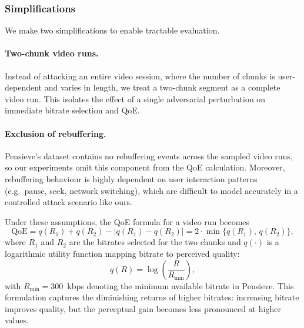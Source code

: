 \documentclass[thesis]{uofithesis} %
\begin{document}
    
    \subsubsection{Simplifications}
    \label{sec:attack-simplification}
    
    We make two simplifications to enable tractable evaluation.
    
    \paragraph{Two-chunk video runs.}
    Instead of attacking an entire video session, where the number of
    chunks is user-dependent and varies in length, we treat a two-chunk
    segment as a complete video run.  This isolates the effect of a single
    adversarial perturbation on immediate bitrate selection and QoE.
    
    \paragraph{Exclusion of rebuffering.}
    Pensieve's dataset contains no rebuffering events across the sampled
    video runs, so our experiments omit this component from the QoE
    calculation.  Moreover, rebuffering behaviour is highly dependent on
    user interaction patterns (e.g.\ pause, seek, network switching), which
    are difficult to model accurately in a controlled attack scenario like ours.
    
    Under these assumptions, the QoE formula for a video run becomes
    \begin{equation}
        \text{QoE}
            = q(R_1) + q(R_2) - \lvert q(R_1) - q(R_2) \rvert
            = 2 \cdot \min\{q(R_1),\, q(R_2)\},
        \label{eq:attack-qoe}
    \end{equation}
    where $R_1$ and $R_2$ are the bitrates selected for the two chunks and
    $q(\cdot)$ is a logarithmic utility function mapping bitrate to
    perceived quality:
    \begin{equation}
        q(R) = \log\!\left(\frac{R}{R_{\min}}\right),
        \label{eq:utility}
    \end{equation}
    with $R_{\min} = 300$~kbps denoting the minimum available bitrate in
    Pensieve.  This formulation captures the diminishing returns of higher
    bitrates: increasing bitrate improves quality, but the perceptual gain
    becomes less pronounced at higher values.
    
\end{document}
